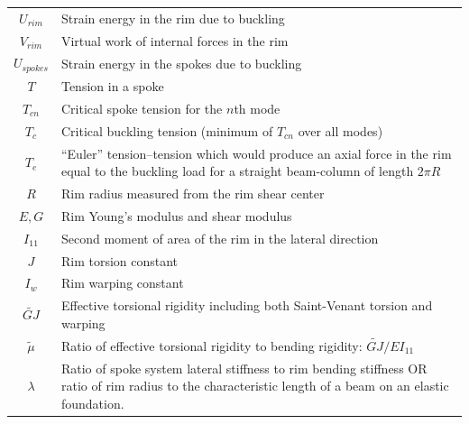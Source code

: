 \documentclass{bmd2016p}
\begin{document}
\begin{tabular}{c|p{12cm}}
$U_{rim}$	& Strain energy in the rim due to buckling\\
$V_{rim}$	& Virtual work of internal forces in the rim\\
$U_{spokes}$& Strain energy in the spokes due to buckling\\
$T$			& Tension in a spoke\\
$T_{cn}$	& Critical spoke tension for the $n$th mode\\
$T_c$		& Critical buckling tension (minimum of $T_{cn}$ over all modes)\\
$T_e$		& ``Euler'' tension--tension which would produce an axial force in the rim
			  equal to the buckling load for a straight beam-column of length $2\pi R$\\
$R$			& Rim radius measured from the rim shear center\\
$E, G$		& Rim Young's modulus and shear modulus\\
$I_{11}$	& Second moment of area of the rim in the lateral direction\\
$J$			& Rim torsion constant\\
$I_w$		& Rim warping constant\\
$\widetilde{GJ}$ & Effective torsional rigidity including both Saint-Venant torsion and warping\\
$\tilde{\mu}$ & Ratio of effective torsional rigidity to bending rigidity: $\widetilde{GJ}/EI_{11}$\\
$\lambda$	& Ratio of spoke system lateral stiffness to rim bending stiffness OR ratio
			  of rim radius to the characteristic length of a beam on an elastic foundation.\\
\hline
\end{tabular}
\end{document}

